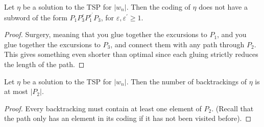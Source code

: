 \begin{lem}\label{lem: groceries lemma p1p3p1p3}
Let $\eta$ be a solution to the TSP for $|w_n|$. Then the coding of $\eta$ does not have a subword of the form $P_1P_3^{\varepsilon}P_1^{\varepsilon^{\prime }}P_3$, for $\varepsilon, \varepsilon^{\prime}\ge 1$.
\end{lem}
\begin{proof}
    Surgery, meaning that you glue together the excursions to $P_1$, and you glue together the excursions to $P_3$, and connect them with any path through $P_2$. This gives something even shorter than optimal since each gluing strictly reduces the length of the path.
\end{proof}

\begin{cor}\label{cor: number of backtrackings}
    Let $\eta$ be a solution to the TSP for $|w_n|$. Then the number of backtrackings of $\eta$ is at most $|P_2|$.
\end{cor}
\begin{proof}
    Every backtracking must contain at least one element of $P_2$. (Recall that the path only has an element in its coding if it has not been visited before).
\end{proof}


